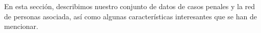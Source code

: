En esta sección, describimos nuestro conjunto de datos de casos penales y la red de personas asociada, así como algunas características interesantes que se han de mencionar.









